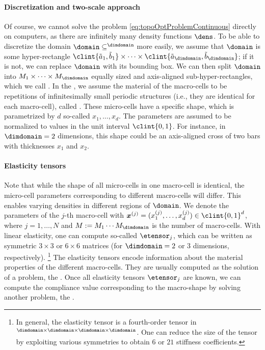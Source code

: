 \paragraph{Discretization and two-scale approach}

Of course, we cannot solve the problem \eqref{eq:topoOptProblemContinuous}
directly on computers,
as there are infinitely many density functions $\dens$.
To be able to discretize the domain $\domain \subset \real^{\dimdomain}$
more easily, we assume that $\domain$ is some hyper-rectangle
$\clint{\tilde{a}_1, \tilde{b}_1} \times \dotsb \times
\clint{\tilde{a}_{\dimdomain}, \tilde{b}_{\dimdomain}}$;
if it is not, we can replace $\domain$ with its bounding box.
We can then split $\domain$ into $M_1 \times \dotsb \times M_{\dimdomain}$
equally sized and axis-aligned sub-hyper-rectangles,
which we call .
In the ,
we assume the material of the macro-cells to be
repetitions of infinitesimally small periodic structures
(i.e., they are identical for each macro-cell),
called .
These micro-cells have a specific shape, which is parametrized by $d$ so-called
 $x_1, \dotsc, x_d$.
The parameters are assumed to be normalized to values in the
unit interval $\clint{0, 1}$.
For instance, in $\dimdomain = 2$ dimensions,
this shape could be an axis-aligned cross of two bars
with thicknesses $x_1$ and $x_2$.

\paragraph{Elasticity tensors}

Note that while the shape of all micro-cells in one macro-cell is identical,
the micro-cell parameters corresponding to different macro-cells will differ.
This enables varying densities in different regions of $\domain$.
We denote the parameters of the $j$-th macro-cell
with $\*x^{(j)} = (x_1^{(j)}, \dotsc, x_d^{(j)}) \in \clint{0, 1}^d$,
where $j = 1, \dotsc, N$ and
$M := M_1 \dotsm M_{\dimdomain}$ is the number of macro-cells.
With linear elasticity,
one can compute so-called  $\etensor_j$,
which can be written as
symmetric $3 \times 3$ or $6 \times 6$ matrices
(for $\dimdomain = 2$ or $3$ dimensions, respectively).%
\footnote{%
  In general, the elasticity tensor is a fourth-order tensor in
  $\real^{\dimdomain \times \dimdomain \times \dimdomain \times \dimdomain}$.
  One can reduce the size of the tensor by exploiting various symmetries
  \cite{Huebner14Mehrdimensionale}
  to obtain $6$ or $21$ stiffness coefficients.%
}
The elasticity tensors encode information about the material properties
of the different macro-cells.
They are usually computed as the solution of a \fem problem,
the .
Once all elasticity tensors $\etensor_j$ are known,
we can compute the compliance value corresponding to the macro-shape
by solving another \fem problem, the .

